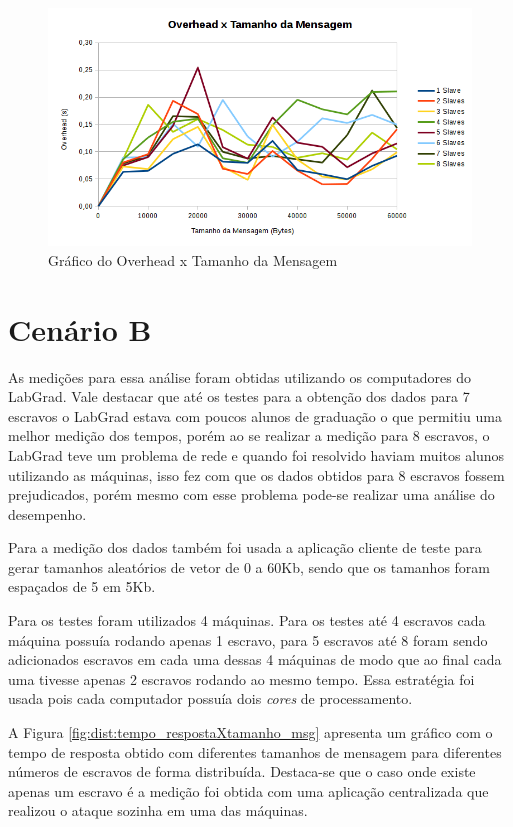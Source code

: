 \documentclass[
	12pt,				%
    oneside,			%
	a4paper,			%
	english,			%
	brazil,				%
	]{abntex2}
\begin{document}
\begin{figure}[!htb]
\centering
\includegraphics[scale=0.65]{figuras/overhead_centralizado.png}
\caption{Gráfico do Overhead x Tamanho da Mensagem}
\label{fig:cent:overheadXtamanho_msg}
\end{figure}


\section{Cenário B}

As medições para essa análise foram obtidas utilizando os computadores do LabGrad. Vale destacar que até os testes para a 
obtenção dos dados para 7 escravos o LabGrad estava com poucos alunos de graduação o que permitiu uma melhor medição dos tempos, porém ao se realizar a medição para 8 escravos, o LabGrad teve um problema de rede e quando foi resolvido haviam muitos alunos utilizando as máquinas, isso fez com que os dados obtidos para 8 escravos fossem prejudicados, porém mesmo com esse problema pode-se realizar uma análise do desempenho.

Para a medição dos dados também foi usada a aplicação cliente de teste para gerar tamanhos aleatórios de vetor de 0 a 60Kb,
sendo que os tamanhos foram espaçados de 5 em 5Kb.

Para os testes foram utilizados 4 máquinas. Para os testes até 4 escravos cada máquina possuía rodando apenas 1 escravo, para 5 escravos até 8 foram sendo adicionados escravos em cada uma dessas 4 máquinas de modo que ao final cada uma tivesse apenas 2
escravos rodando ao mesmo tempo. Essa estratégia foi usada pois cada computador possuía dois \textit{cores} de processamento.

A Figura \ref{fig:dist:tempo_respostaXtamanho_msg} apresenta um gráfico com o tempo de resposta obtido com diferentes tamanhos de mensagem para diferentes números de escravos de forma distribuída. Destaca-se que o caso onde existe apenas um escravo é a medição foi obtida com uma aplicação centralizada que realizou o ataque sozinha em uma das máquinas.
\end{document}
